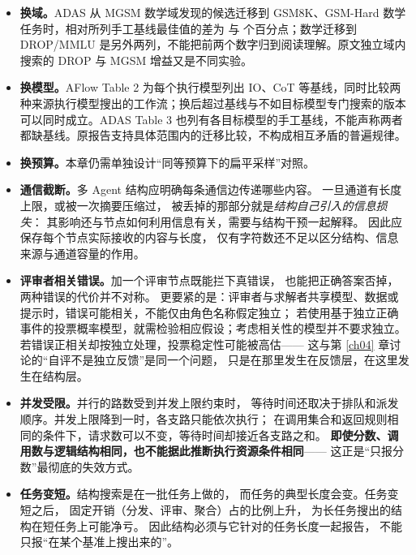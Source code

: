 \begin{itemize}
  \item \textbf{换域。}ADAS 从 MGSM 数学域发现的候选迁移到 GSM8K、GSM-Hard 数学任务时，相对所列手工基线最佳值的差为  与  个百分点；数学迁移到 DROP/MMLU 是另外两列，不能把前两个数字归到阅读理解。原文独立域内搜索的 DROP 与 MGSM 增益又是不同实验\cite{adas-2408}。
  \item \textbf{换模型。}AFlow Table 2 为每个执行模型列出 IO、CoT 等基线，同时比较两种来源执行模型搜出的工作流；换后超过基线与不如目标模型专门搜索的版本可以同时成立。ADAS Table 3 也列有各目标模型的手工基线，不能声称两者都缺基线。原报告支持具体范围内的迁移比较，不构成相互矛盾的普遍规律\cite{aflow-2410,adas-2408}。
  \item \textbf{换预算。}本章仍需单独设计``同等预算下的扁平采样''对照\cite{aflow-2410}。
  \item \textbf{通信截断。}多 Agent 结构应明确每条通信边传递哪些内容。
        一旦通道有长度上限，或被一次摘要压缩过，
        被丢掉的那部分就是\emph{结构自己引入的信息损失}：
        其影响还与节点如何利用信息有关，需要与结构干预一起解释。
        因此应保存每个节点实际接收的内容与长度，
        仅有字符数还不足以区分结构、信息来源与通道容量的作用。
  \item \textbf{评审者相关错误。}加一个评审节点既能拦下真错误，
        也能把正确答案否掉，两种错误的代价并不对称。
        更要紧的是：评审者与求解者共享模型、数据或提示时，错误可能相关，不能仅由角色名称假定独立；
        若使用基于独立正确事件的投票概率模型，就需检验相应假设；考虑相关性的模型并不要求独立。
        若错误正相关却按独立处理，投票稳定性可能被高估——
        这与第 \ref{ch04} 章讨论的``自评不是独立反馈''是同一个问题，
        只是在那里发生在反馈层，在这里发生在结构层。
  \item \textbf{并发受限。}并行的路数受到并发上限约束时，
        等待时间还取决于排队和派发顺序。并发上限降到一时，各支路只能依次执行；
        在调用集合和返回规则相同的条件下，请求数可以不变，等待时间却接近各支路之和。
        \textbf{即使分数、调用数与逻辑结构相同，也不能据此推断执行资源条件相同}——
        这正是``只报分数''最彻底的失效方式。
  \item \textbf{任务变短。}结构搜索是在一批任务上做的，
        而任务的典型长度会变。任务变短之后，
        固定开销（分发、评审、聚合）占的比例上升，
        为长任务搜出的结构在短任务上可能净亏。
        因此结构必须与它针对的任务长度一起报告，
        不能只报``在某个基准上搜出来的''。
\end{itemize}

